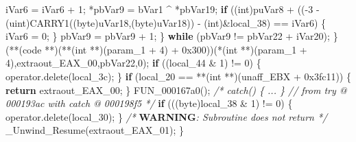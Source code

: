 \documentclass[
]{article}
\newenvironment{Shaded}{}{}
\newcommand{\AlertTok}[1]{\textcolor[rgb]{1.00,0.00,0.00}{\textbf{#1}}}
\newcommand{\BaseNTok}[1]{\textcolor[rgb]{0.25,0.63,0.44}{#1}}
\newcommand{\CommentTok}[1]{\textcolor[rgb]{0.38,0.63,0.69}{\textit{#1}}}
\newcommand{\ControlFlowTok}[1]{\textcolor[rgb]{0.00,0.44,0.13}{\textbf{#1}}}
\newcommand{\DataTypeTok}[1]{\textcolor[rgb]{0.56,0.13,0.00}{#1}}
\newcommand{\DecValTok}[1]{\textcolor[rgb]{0.25,0.63,0.44}{#1}}
\newcommand{\NormalTok}[1]{#1}
\newcommand{\OperatorTok}[1]{\textcolor[rgb]{0.40,0.40,0.40}{#1}}
\begin{document}
\begin{Shaded}
\begin{Highlighting}[]
\NormalTok{      iVar6 }\OperatorTok{=}\NormalTok{ iVar6 }\OperatorTok{+} \DecValTok{1}\OperatorTok{;}
      \OperatorTok{*}\NormalTok{pbVar9 }\OperatorTok{=}\NormalTok{ bVar1 }\OperatorTok{\^{}} \OperatorTok{*}\NormalTok{pbVar19}\OperatorTok{;}
      \ControlFlowTok{if} \OperatorTok{((}\DataTypeTok{int}\OperatorTok{)}\NormalTok{puVar8 }\OperatorTok{+} \OperatorTok{(({-}}\DecValTok{3} \OperatorTok{{-}} \OperatorTok{(}\NormalTok{uint}\OperatorTok{)}\NormalTok{CARRY1}\OperatorTok{((}\NormalTok{byte}\OperatorTok{)}\NormalTok{uVar18}\OperatorTok{,(}\NormalTok{byte}\OperatorTok{)}\NormalTok{uVar18}\OperatorTok{))} \OperatorTok{{-}} \OperatorTok{(}\DataTypeTok{int}\OperatorTok{)\&}\NormalTok{local\_38}\OperatorTok{)} \OperatorTok{==}\NormalTok{ iVar6}\OperatorTok{)}
      \OperatorTok{\{}
\NormalTok{        iVar6 }\OperatorTok{=} \DecValTok{0}\OperatorTok{;}
      \OperatorTok{\}}
\NormalTok{      pbVar9 }\OperatorTok{=}\NormalTok{ pbVar9 }\OperatorTok{+} \DecValTok{1}\OperatorTok{;}
    \OperatorTok{\}} \ControlFlowTok{while} \OperatorTok{(}\NormalTok{pbVar9 }\OperatorTok{!=}\NormalTok{ pbVar22 }\OperatorTok{+}\NormalTok{ iVar20}\OperatorTok{);}
  \OperatorTok{\}}
  \OperatorTok{(**(}\NormalTok{code }\OperatorTok{**)(**(}\DataTypeTok{int} \OperatorTok{**)(}\NormalTok{param\_1 }\OperatorTok{+} \DecValTok{4}\OperatorTok{)} \OperatorTok{+} \BaseNTok{0x300}\OperatorTok{))(*(}\DataTypeTok{int} \OperatorTok{**)(}\NormalTok{param\_1 }\OperatorTok{+} \DecValTok{4}\OperatorTok{),}\NormalTok{extraout\_EAX\_00}\OperatorTok{,}\NormalTok{pbVar22}\OperatorTok{,}\DecValTok{0}\OperatorTok{);}
  \ControlFlowTok{if} \OperatorTok{((}\NormalTok{local\_44 }\OperatorTok{\&} \DecValTok{1}\OperatorTok{)} \OperatorTok{!=} \DecValTok{0}\OperatorTok{)} \OperatorTok{\{}
\NormalTok{    operator}\OperatorTok{.}\NormalTok{delete}\OperatorTok{(}\NormalTok{local\_3c}\OperatorTok{);}
  \OperatorTok{\}}
  \ControlFlowTok{if} \OperatorTok{(}\NormalTok{local\_20 }\OperatorTok{==} \OperatorTok{**(}\DataTypeTok{int} \OperatorTok{**)(}\NormalTok{unaff\_EBX }\OperatorTok{+} \BaseNTok{0x3fc11}\OperatorTok{))} \OperatorTok{\{}
    \ControlFlowTok{return}\NormalTok{ extraout\_EAX\_00}\OperatorTok{;}
  \OperatorTok{\}}
\NormalTok{  FUN\_000167a0}\OperatorTok{();}
                    \CommentTok{/* catch() \{ ... \} // from try @ 000193ac with catch @ 000198f5 */}
  \ControlFlowTok{if} \OperatorTok{(((}\NormalTok{byte}\OperatorTok{)}\NormalTok{local\_38 }\OperatorTok{\&} \DecValTok{1}\OperatorTok{)} \OperatorTok{!=} \DecValTok{0}\OperatorTok{)} \OperatorTok{\{}
\NormalTok{    operator}\OperatorTok{.}\NormalTok{delete}\OperatorTok{(}\NormalTok{local\_30}\OperatorTok{);}
  \OperatorTok{\}}
                    \CommentTok{/* }\AlertTok{WARNING}\CommentTok{: Subroutine does not return */}
\NormalTok{  \_Unwind\_Resume}\OperatorTok{(}\NormalTok{extraout\_EAX\_01}\OperatorTok{);}
\OperatorTok{\}}
\end{Highlighting}
\end{Shaded}
\end{document}
